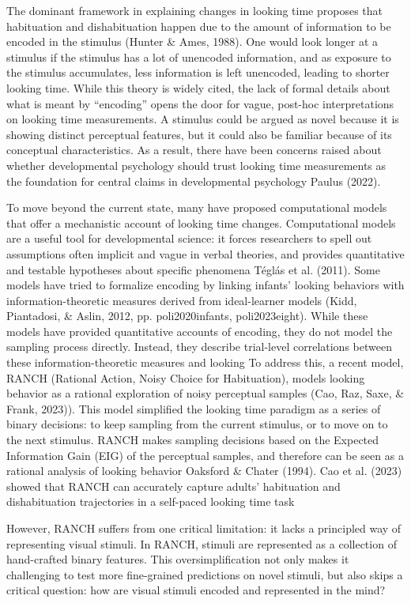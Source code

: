 \documentclass[10pt, letterpaper]{article}
\begin{document}
The dominant framework in explaining changes in looking time proposes
that habituation and dishabituation happen due to the amount of
information to be encoded in the stimulus (Hunter \& Ames, 1988). One
would look longer at a stimulus if the stimulus has a lot of unencoded
information, and as exposure to the stimulus accumulates, less
information is left unencoded, leading to shorter looking time. While
this theory is widely cited, the lack of formal details about what is
meant by ``encoding'' opens the door for vague, post-hoc interpretations
on looking time measurements. A stimulus could be argued as novel
because it is showing distinct perceptual features, but it could also be
familiar because of its conceptual characteristics. As a result, there
have been concerns raised about whether developmental psychology should
trust looking time measurements as the foundation for central claims in
developmental psychology Paulus (2022).

To move beyond the current state, many have proposed computational
models that offer a mechanistic account of looking time changes.
Computational models are a useful tool for developmental science: it
forces researchers to spell out assumptions often implicit and vague in
verbal theories, and provides quantitative and testable hypotheses about
specific phenomena Téglás et al. (2011). Some models have tried to
formalize encoding by linking infants' looking behaviors with
information-theoretic measures derived from ideal-learner models (Kidd,
Piantadosi, \& Aslin, 2012, pp. poli2020infants, poli2023eight). While
these models have provided quantitative accounts of encoding, they do
not model the sampling process directly. Instead, they describe
trial-level correlations between these information-theoretic measures
and looking To address this, a recent model, RANCH (Rational Action,
Noisy Choice for Habituation), models looking behavior as a rational
exploration of noisy perceptual samples (Cao, Raz, Saxe, \& Frank,
2023)). This model simplified the looking time paradigm as a series of
binary decisions: to keep sampling from the current stimulus, or to move
on to the next stimulus. RANCH makes sampling decisions based on the
Expected Information Gain (EIG) of the perceptual samples, and therefore
can be seen as a rational analysis of looking behavior Oaksford \&
Chater (1994). Cao et al. (2023) showed that RANCH can accurately
capture adults' habituation and dishabituation trajectories in a
self-paced looking time task

However, RANCH suffers from one critical limitation: it lacks a
principled way of representing visual stimuli. In RANCH, stimuli are
represented as a collection of hand-crafted binary features. This
oversimplification not only makes it challenging to test more
fine-grained predictions on novel stimuli, but also skips a critical
question: how are visual stimuli encoded and represented in the mind?
\end{document}
